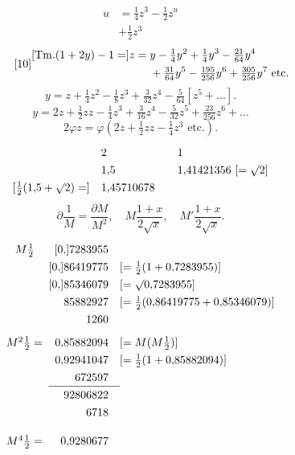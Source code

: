 \ClosingRule
\noindent [S. 23]
\[\begin{aligned}
u&=\tfrac14z^3-\tfrac12z^u\\
&+\tfrac12z^3
\end{aligned}\]
\begin{equation}\tag*{[10]}\begin{aligned}
\relax[\mathrm{Tm.}(1+2y)-1=]z={}&y-\tfrac14y^2+\tfrac14y^3-\tfrac{21}{64}y^4\\
&+\tfrac{31}{64}y^5-\tfrac{195}{256}y^6+\tfrac{305}{256}y^7\text{ etc.}
\end{aligned}\end{equation}
\begin{equation}\tag*{[11]}y=z+\tfrac14z^2-\tfrac18z^3+\tfrac3{32}z^4-\tfrac5{64}[z^5+\ldots].\end{equation}
\noindent [S. 25]
\begin{equation}\tag*{[12]}y=2z+\tfrac12zz-\tfrac14z^3+\tfrac3{16}z^4-\tfrac5{32}z^5+\tfrac{23}{256}z^6+\ldots\end{equation}
\begin{equation}\tag*{[13]}2\varphi z=\varphi(2z+\tfrac12zz-\tfrac14z^3\text{ etc.}).\end{equation}
\ClosingRule
\clearpage
{}
\noindent [S. 26]
\[\renewcommand{\arraystretch}{1.3}\begin{array}{r@{\quad}l@{\qquad}l}
&2&1\\
&1{,}5&1{,}41421356\ [=\surd2]\\
{}[\tfrac12(1{,}5+\surd2)=]&1{,}45710678&
\end{array}\]
\[\partial\frac1M=\frac{\partial M}{M^2},\quad M\frac{1+x}{2\surd x},\quad M'\frac{1+x}{2\surd x}.\]
\ClosingRule
\noindent [S. 38]
\[\renewcommand{\arraystretch}{1.3}\begin{array}{r@{\;}r@{\quad}l}
M\frac12\quad&[0{,}]7283955&\\
&[0{,}]86419775&[=\tfrac12(1+0{,}7283955)]\\
&[0{,}]85346079&[=\surd0{,}7283955]\\
&85882927&[=\tfrac12(0{,}86419775+0{,}85346079)]\\
&1260&\\[5pt]
M^2\frac12={}&0{,}85882094&[=M(M\tfrac12)]\\
&0{,}92941047&[=\tfrac12(1+0{,}85882094)]\\
&672597&\\\cline{2-2}
&92806822&\\
&6718&\\[10pt]
M^4\frac12={}&0{,}9280677&
\end{array}\]
\ClosingRule
\clearpage
\endgroup

